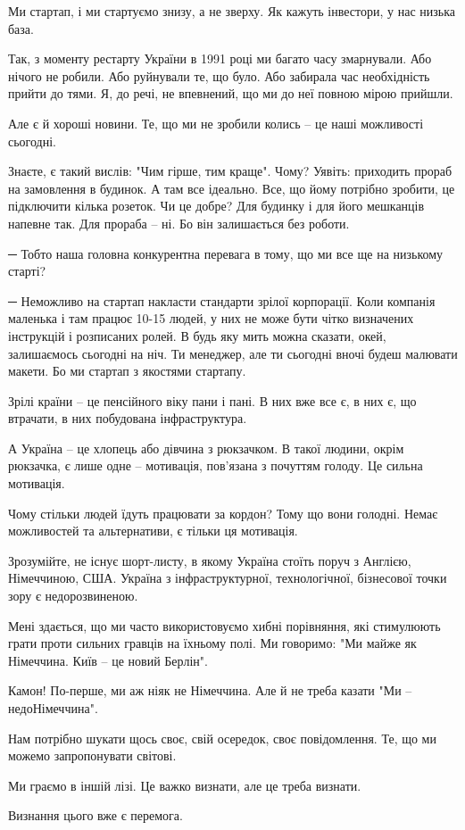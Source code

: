 Ми стартап, і ми стартуємо знизу, а не зверху. Як кажуть інвестори, у нас
низька база.

Так, з моменту рестарту України в 1991 році ми багато часу змарнували. Або
нічого не робили. Або руйнували те, що було. Або забирала час необхідність
прийти до тями. Я, до речі, не впевнений, що ми до неї повною мірою прийшли.

Але є й хороші новини. Те, що ми не зробили колись – це наші можливості
сьогодні. 

Знаєте, є такий вислів: "Чим гірше, тим краще". Чому? Уявіть: приходить прораб
на замовлення в будинок. А там все ідеально. Все, що йому потрібно зробити, це
підключити кілька розеток. Чи це добре? Для будинку і для його мешканців
напевне так. Для прораба – ні. Бо він залишається без роботи.

─ Тобто наша головна конкурентна перевага в тому, що ми все ще на низькому
старті?

─ Неможливо на стартап накласти стандарти зрілої корпорації. Коли компанія
маленька і там працює 10-15 людей, у них не може бути чітко визначених
інструкцій і розписаних ролей. В будь яку мить можна сказати, окей, залишаємось
сьогодні на ніч. Ти менеджер, але ти сьогодні вночі будеш малювати макети. Бо
ми стартап з якостями стартапу.

Зрілі країни – це пенсійного віку пани і пані. В них вже все є, в них є, що
втрачати, в них побудована інфраструктура.

А Україна – це хлопець або дівчина з рюкзачком. В такої людини, окрім рюкзачка,
є лише одне – мотивація, пов’язана з почуттям голоду. Це сильна мотивація. 

Чому стільки людей їдуть працювати за кордон? Тому що вони голодні. Немає
можливостей та альтернативи, є тільки ця мотивація.

Зрозумійте, не існує шорт-листу, в якому Україна стоїть поруч з Англією,
Німеччиною, США. Україна з інфраструктурної, технологічної, бізнесової точки
зору є недорозвиненою.

Мені здається, що ми часто використовуємо хибні порівняння, які стимулюють
грати проти сильних гравців на їхньому полі. Ми говоримо: "Ми майже як
Німеччина. Київ – це новий Берлін".

Камон! По-перше, ми аж ніяк не Німеччина. Але й не треба казати "Ми –
недоНімеччина".

Нам потрібно шукати щось своє, свій осередок, своє повідомлення. Те, що ми
можемо запропонувати світові.

Ми граємо в іншій лізі. Це важко визнати, але це треба визнати.

Визнання цього вже є перемога.

